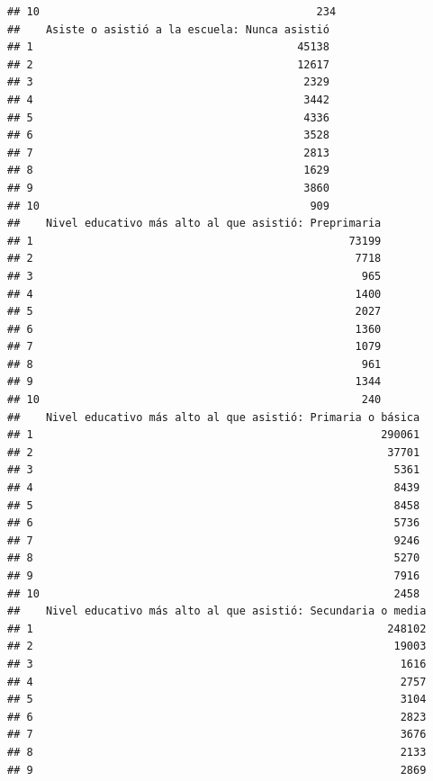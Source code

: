 \documentclass[11pt,]{article}
\begin{document}
\begin{verbatim}
## 10                                           234
##    Asiste o asistió a la escuela: Nunca asistió
## 1                                         45138
## 2                                         12617
## 3                                          2329
## 4                                          3442
## 5                                          4336
## 6                                          3528
## 7                                          2813
## 8                                          1629
## 9                                          3860
## 10                                          909
##    Nivel educativo más alto al que asistió: Preprimaria
## 1                                                 73199
## 2                                                  7718
## 3                                                   965
## 4                                                  1400
## 5                                                  2027
## 6                                                  1360
## 7                                                  1079
## 8                                                   961
## 9                                                  1344
## 10                                                  240
##    Nivel educativo más alto al que asistió: Primaria o básica
## 1                                                      290061
## 2                                                       37701
## 3                                                        5361
## 4                                                        8439
## 5                                                        8458
## 6                                                        5736
## 7                                                        9246
## 8                                                        5270
## 9                                                        7916
## 10                                                       2458
##    Nivel educativo más alto al que asistió: Secundaria o media
## 1                                                       248102
## 2                                                        19003
## 3                                                         1616
## 4                                                         2757
## 5                                                         3104
## 6                                                         2823
## 7                                                         3676
## 8                                                         2133
## 9                                                         2869

\end{verbatim}
\end{document}
